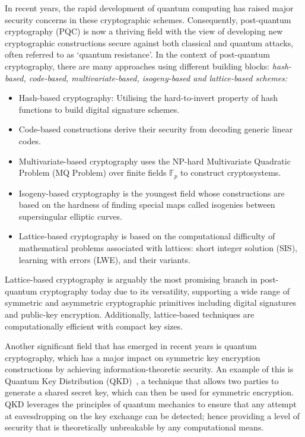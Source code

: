 \documentclass[cryptography,review,submit,pdftex,moreauthors,amsmath,amssymb,aps,strict]{Definitions/mdpi}
\begin{document}
In recent years, the rapid development of quantum computing has raised major security concerns in these cryptographic schemes. Consequently, post-quantum cryptography (PQC) is now a thriving field with the view of developing new cryptographic constructions secure against both classical and quantum attacks, often referred to as `quantum resistance'. In the context of post-quantum cryptography, there are many approaches using different building blocks: \textit{hash-based, code-based, multivariate-based, isogeny-based and lattice-based schemes:}
\begin{itemize}
    \item Hash-based cryptography: Utilising the hard-to-invert property of hash functions to build digital signature schemes.
    \item Code-based constructions derive their security from decoding generic linear codes.
    \item Multivariate-based cryptography uses the NP-hard Multivariate Quadratic Problem (MQ Problem) over finite fields $\mathbb{F}_p$ to construct cryptosystems.
    \item Isogeny-based cryptography is the youngest field whose constructions are based on the hardness of finding special maps called isogenies between supersingular elliptic curves.
    \item Lattice-based cryptography is based on the computational difficulty of mathematical problems associated with lattices: short integer solution (SIS), learning with errors (LWE), and their variants.
\end{itemize}

Lattice-based cryptography is arguably the most promising branch in post-quantum cryptography today due to its versatility, supporting a wide range of symmetric and asymmetric cryptographic primitives including digital signatures and public-key encryption. Additionally, lattice-based techniques are computationally efficient with compact key sizes.

Another significant field that has emerged in recent years is quantum cryptography, which has a major impact on symmetric key encryption constructions by achieving information-theoretic security. An example of this is Quantum Key Distribution (QKD)~\cite{BB84,E91}, a technique that allows two parties to generate a shared secret key, which can then be used for symmetric encryption. QKD leverages the principles of quantum mechanics to ensure that any attempt at eavesdropping on the key exchange can be detected; hence providing a level of security that is theoretically unbreakable by any computational means.
\end{document}
